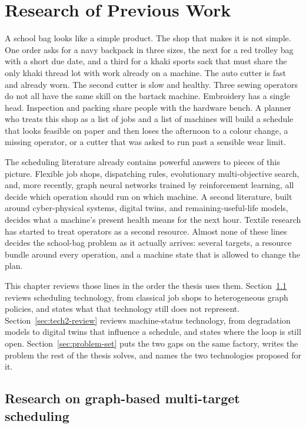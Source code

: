 \chapter{Research of Previous Work}
\label{ch:previous}

A school bag looks like a simple product. The shop that makes it is not simple. One order asks for a navy backpack in three sizes, the next for a red trolley bag with a short due date, and a third for a khaki sports sack that must share the only khaki thread lot with work already on a machine. The auto cutter is fast and already worn. The second cutter is slow and healthy. Three sewing operators do not all have the same skill on the bartack machine. Embroidery has a single head. Inspection and packing share people with the hardware bench. A planner who treats this shop as a list of jobs and a list of machines will build a schedule that looks feasible on paper and then loses the afternoon to a colour change, a missing operator, or a cutter that was asked to run past a sensible wear limit.

The scheduling literature already contains powerful answers to pieces of this picture. Flexible job shops, dispatching rules, evolutionary multi-objective search, and, more recently, graph neural networks trained by reinforcement learning, all decide which operation should run on which machine. A second literature, built around cyber-physical systems, digital twins, and remaining-useful-life models, decides what a machine's present health means for the next hour. Textile research has started to treat operators as a second resource. Almost none of these lines decides the school-bag problem as it actually arrives: several targets, a resource bundle around every operation, and a machine state that is allowed to change the plan.

This chapter reviews those lines in the order the thesis uses them. Section~\ref{sec:tech1-review} reviews scheduling technology, from classical job shops to heterogeneous graph policies, and states what that technology still does not represent. Section~\ref{sec:tech2-review} reviews machine-status technology, from degradation models to digital twins that influence a schedule, and states where the loop is still open. Section~\ref{sec:problem-set} puts the two gaps on the same factory, writes the problem the rest of the thesis solves, and names the two technologies proposed for it.

\section{Research on graph-based multi-target scheduling}
\label{sec:tech1-review}

